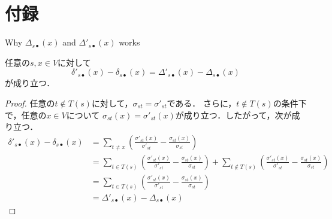 \documentclass[dvipdfmx,fleqn]{beamer}
\begin{document}
\section{付録}
\begin{frame}{Why $\Delta_{s\bullet}(x)$ and $\Delta'_{s\bullet}(x)$ works}
  \begin{theorem}
    任意の$s,x\in V$に対して
    \begin{equation*}
      \delta'_{s\bullet}(x)-\delta_{s\bullet}(x)=\Delta'_{s\bullet}(x)-\Delta_{s\bullet}(x)
    \end{equation*}
    が成り立つ．
  \end{theorem}
  \begin{proof}
    任意の$t\notin T(s)$に対して，$\sigma_{st}=\sigma'_{st}$である．
    さらに，$t\notin T(s)$の条件下で，任意の$x\in V$について
    $\sigma_{st}(x)=\sigma'_{st}(x)$が成り立つ．したがって，次が成り立つ．
    \begin{equation*}
      \begin{aligned}
        \delta'_{s\bullet}(x)-\delta_{s\bullet}(x)
        &=\sum_{t\neq x}\left(\frac{\sigma'_{st}(x)}{\sigma'_{st}}-\frac{\sigma_{st}(x)}{\sigma_{st}}\right) \\
        &=\sum_{t\in T(s)}\left(\frac{\sigma'_{st}(x)}{\sigma'_{st}}-\frac{\sigma_{st}(x)}{\sigma_{st}}\right)
        +\sum_{t\notin T(s)}\left(\frac{\sigma'_{st}(x)}{\sigma'_{st}}-\frac{\sigma_{st}(x)}{\sigma_{st}}\right) \\
        &=\sum_{t\in T(s)}\left(\frac{\sigma'_{st}(x)}{\sigma'_{st}}-\frac{\sigma_{st}(x)}{\sigma_{st}}\right) \\
        &=\Delta'_{s\bullet}(x)-\Delta_{s\bullet}(x)
      \end{aligned}
    \end{equation*}
  \end{proof}
\end{frame}
\end{document}
